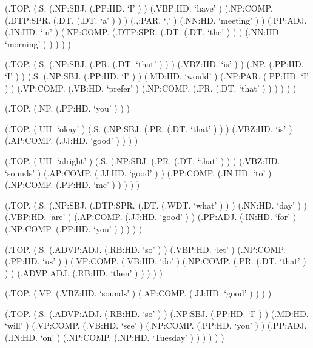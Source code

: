 \documentclass[10pt]{article}
\begin{document}
\begin{parsetree}  (.TOP. (.S. (.NP:SBJ. (.PP:HD. `I' ) ) (.VBP:HD. `have' ) (.NP:COMP. (.DTP:SPR. (.DT. (.DT. `a' ) ) ) (.,:PAR. `,' ) (.NN:HD. `meeting' ) ) (.PP:ADJ. (.IN:HD. `in' ) (.NP:COMP. (.DTP:SPR. (.DT. (.DT. `the' ) ) ) (.NN:HD. `morning' ) ) ) ) ) \end{parsetree}

\begin{parsetree}  (.TOP. (.S. (.NP:SBJ. (.PR. (.DT. `that' ) ) ) (.VBZ:HD. `is' ) ) (.NP. (.PP:HD. `I' ) ) (.S. (.NP:SBJ. (.PP:HD. `I' ) ) (.MD:HD. `would' ) (.NP:PAR. (.PP:HD. `I' ) ) (.VP:COMP. (.VB:HD. `prefer' ) (.NP:COMP. (.PR. (.DT. `that' ) ) ) ) ) ) \end{parsetree}

\begin{parsetree}  (.TOP. (.NP. (.PP:HD. `you' ) ) ) \end{parsetree}

\begin{parsetree}  (.TOP. (.UH. `okay' ) (.S. (.NP:SBJ. (.PR. (.DT. `that' ) ) ) (.VBZ:HD. `is' ) (.AP:COMP. (.JJ:HD. `good' ) ) ) ) \end{parsetree}

\begin{parsetree}  (.TOP. (.UH. `alright' ) (.S. (.NP:SBJ. (.PR. (.DT. `that' ) ) ) (.VBZ:HD. `sounds' ) (.AP:COMP. (.JJ:HD. `good' ) ) (.PP:COMP. (.IN:HD. `to' ) (.NP:COMP. (.PP:HD. `me' ) ) ) ) ) \end{parsetree}

\begin{parsetree}  (.TOP. (.S. (.NP:SBJ. (.DTP:SPR. (.DT. (.WDT. `what' ) ) ) (.NN:HD. `day' ) ) (.VBP:HD. `are' ) (.AP:COMP. (.JJ:HD. `good' ) ) (.PP:ADJ. (.IN:HD. `for' ) (.NP:COMP. (.PP:HD. `you' ) ) ) ) ) \end{parsetree}

\begin{parsetree}  (.TOP. (.S. (.ADVP:ADJ. (.RB:HD. `so' ) ) (.VBP:HD. `let' ) (.NP:COMP. (.PP:HD. `us' ) ) (.VP:COMP. (.VB:HD. `do' ) (.NP:COMP. (.PR. (.DT. `that' ) ) ) (.ADVP:ADJ. (.RB:HD. `then' ) ) ) ) ) \end{parsetree}

\begin{parsetree}  (.TOP. (.VP. (.VBZ:HD. `sounds' ) (.AP:COMP. (.JJ:HD. `good' ) ) ) ) \end{parsetree}

\begin{parsetree}  (.TOP. (.S. (.ADVP:ADJ. (.RB:HD. `so' ) ) (.NP:SBJ. (.PP:HD. `I' ) ) (.MD:HD. `will' ) (.VP:COMP. (.VB:HD. `see' ) (.NP:COMP. (.PP:HD. `you' ) ) (.PP:ADJ. (.IN:HD. `on' ) (.NP:COMP. (.NP:HD. `Tuesday' ) ) ) ) ) ) \end{parsetree}
\end{document}
